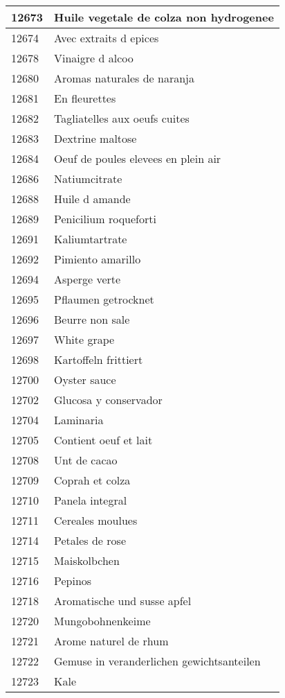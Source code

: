 \begin{longtable}{|l|l|}
12673 & Huile vegetale de colza non hydrogenee \\ \hline 
12674 & Avec extraits d epices \\ \hline 
12678 & Vinaigre d alcoo \\ \hline 
12680 & Aromas naturales de naranja \\ \hline 
12681 & En fleurettes \\ \hline 
12682 & Tagliatelles aux oeufs cuites \\ \hline 
12683 & Dextrine maltose \\ \hline 
12684 & Oeuf de poules elevees en plein air \\ \hline 
12686 & Natiumcitrate \\ \hline 
12688 & Huile d amande \\ \hline 
12689 & Penicilium roqueforti \\ \hline 
12691 & Kaliumtartrate \\ \hline 
12692 & Pimiento amarillo \\ \hline 
12694 & Asperge verte \\ \hline 
12695 & Pflaumen getrocknet \\ \hline 
12696 & Beurre non sale \\ \hline 
12697 & White grape \\ \hline 
12698 & Kartoffeln frittiert \\ \hline 
12700 & Oyster sauce \\ \hline 
12702 & Glucosa y conservador \\ \hline 
12704 & Laminaria \\ \hline 
12705 & Contient oeuf et lait \\ \hline 
12708 & Unt de cacao \\ \hline 
12709 & Coprah et colza \\ \hline 
12710 & Panela integral \\ \hline 
12711 & Cereales moulues \\ \hline 
12714 & Petales de rose \\ \hline 
12715 & Maiskolbchen \\ \hline 
12716 & Pepinos \\ \hline 
12718 & Aromatische und susse apfel \\ \hline 
12720 & Mungobohnenkeime \\ \hline 
12721 & Arome naturel de rhum \\ \hline 
12722 & Gemuse in veranderlichen gewichtsanteilen \\ \hline 
12723 & Kale \\ \hline 

\end{longtable}
